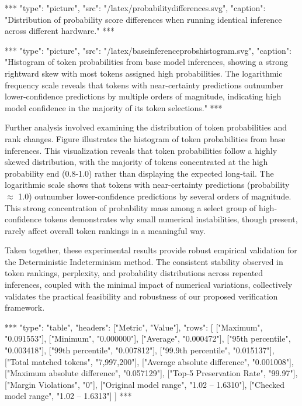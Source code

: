 \documentclass{article}
\begin{document}
\begin{center}
***
"type": "picture",
"src": "/latex/probabilitydifferences.svg",
"caption": "Distribution of probability score differences when running identical inference across different hardware."
***
\end{center}

\begin{center}
***
"type": "picture",
"src": "/latex/baseinferenceprobshistogram.svg",
"caption": "Histogram of token probabilities from base model inferences, showing a strong rightward skew with most tokens assigned high probabilities. The logarithmic frequency scale reveals that tokens with near-certainty predictions outnumber lower-confidence predictions by multiple orders of magnitude, indicating high model confidence in the majority of its token selections."
***
\end{center}

Further analysis involved examining the distribution of token probabilities and rank changes. Figure illustrates the histogram of token probabilities from base inferences. This visualization reveals that token probabilities follow a highly skewed distribution, with the majority of tokens concentrated at the high probability end (0.8-1.0) rather than displaying the expected long-tail. The logarithmic scale shows that tokens with near-certainty predictions (probability $\approx$ 1.0) outnumber lower-confidence predictions by several orders of magnitude. This strong concentration of probability mass among a select group of high-confidence tokens demonstrates why small numerical instabilities, though present, rarely affect overall token rankings in a meaningful way.

Taken together, these experimental results provide robust empirical validation for the Deterministic Indeterminism method.  The consistent stability observed in token rankings, perplexity, and probability distributions across repeated inferences, coupled with the minimal impact of numerical variations, collectively validates the practical feasibility and robustness of our proposed verification framework.

\begin{center}
***
"type": "table",
"headers": ["Metric", "Value"],
"rows": [
    ["Maximum", "0.091553"],
    ["Minimum", "0.000000"],
    ["Average", "0.000472"],
    ["95th percentile", "0.003418"],
    ["99th percentile", "0.007812"],
    ["99.9th percentile", "0.015137"],
    ["Total matched tokens", "7,997,200"],
    ["Average absolute difference", "0.001008"],
    ["Maximum absolute difference", "0.057129"],
    ["Top-5 Preservation Rate", "99.97"],
    ["Margin Violations", "0"],
    ["Original model range", "1.02 -- 1.6310"],
    ["Checked model range", "1.02 -- 1.6313"]
]
***
\end{center}
\end{document}
